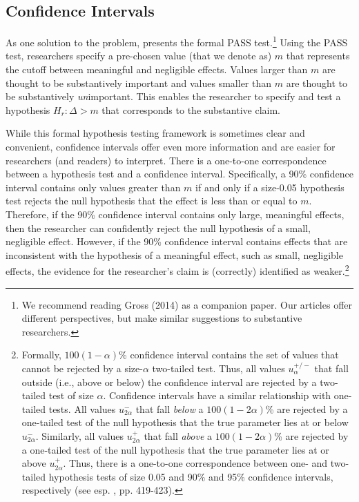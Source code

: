\documentclass[12pt]{article}
\begin{document}
\subsection*{Confidence Intervals}

As one solution to the problem, \cite{Gross2014} presents the formal PASS test.\footnote{We recommend reading Gross (2014) as a companion paper. Our articles offer different perspectives, but make similar suggestions to substantive researchers.} Using the PASS test, researchers specify a pre-chosen value (that we denote as) $m$ that represents the cutoff between meaningful and negligible effects. Values larger than $m$ are thought to be substantively important and values smaller than $m$ are thought to be substantively \textit{un}important. This enables the researcher to specify and test a hypothesis $H_r: \Delta > m$ that corresponds to the substantive claim.

While this formal hypothesis testing framework is sometimes clear and convenient, confidence intervals offer even more information and are easier for researchers (and readers) to interpret. There is a one-to-one correspondence between a hypothesis test and a confidence interval. Specifically, a 90\% confidence interval contains only values greater than $m$ if and only if a size-0.05 hypothesis test rejects the null hypothesis that the effect is less than or equal to $m$. Therefore, if the 90\% confidence interval contains only large, meaningful effects, then the researcher can confidently reject the null hypothesis of a small, negligible effect. However, if the 90\% confidence interval contains effects that are inconsistent with the hypothesis of a meaningful effect, such as small, negligible effects, the evidence for the researcher's claim is (correctly) identified as weaker.\footnote{
Formally, $100(1-\alpha)$\% confidence interval contains the set of values that cannot be rejected by a size-$\alpha$ two-tailed test. Thus, all values $u^{+/-}_{\alpha}$ that fall outside (i.e., above or below) the confidence interval are rejected by a two-tailed test of size $\alpha$. Confidence intervals have a similar relationship with one-tailed tests. All values $u^{-}_{2\alpha}$ that fall \textit{below} a $100(1-2\alpha)$\% are rejected by a one-tailed test of the null hypothesis that the true parameter lies at or below $u^{-}_{2\alpha}$. Similarly, all values $u^{+}_{2\alpha}$ that fall \textit{above} a $100(1-2\alpha)$\% are rejected by a one-tailed test of the null hypothesis that the true parameter lies at or above $u^{+}_{2\alpha}$. Thus, there is a one-to-one correspondence between one- and two-tailed hypothesis tests of size 0.05 and 90\% and 95\% confidence intervals, respectively (see esp. \citealt{CasellaBerger2002}, pp. 419-423).
}
\end{document}
